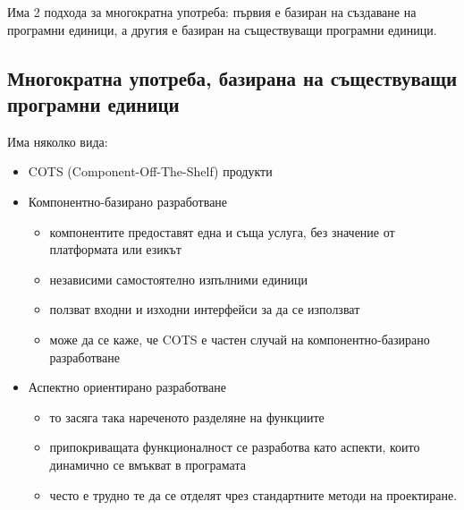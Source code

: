\documentclass[fleqn,12pt]{article}
\begin{document}
Има 2 подхода за многократна употреба: първия е базиран на създаване на програмни единици, а другия е базиран на съществуващи програмни единици.

\subsection{Многократна употреба, базирана на съществуващи програмни единици}

Има няколко вида:
\begin{itemize}
	\item COTS (Component-Off-The-Shelf) продукти
	\item Компонентно-базирано разработване
	\begin{itemize}
		\item компонентите предоставят една и съща услуга, без значение от платформата или езикът
		\item независими самостоятелно изпълними единици
		\item ползват входни и изходни интерфейси за да се използват
		\item може да се каже, че COTS е частен случай на компонентно-базирано разработване
	\end{itemize}
	\item Аспектно ориентирано разработване
	\begin{itemize}
		\item то засяга така нареченото разделяне на функциите
		\item припокриващата функционалност се разработва като аспекти, които динамично се вмъкват в програмата
		\item често е трудно те да се отделят чрез стандартните методи на проектиране.

\end{itemize}
\end{itemize}
\end{document}
